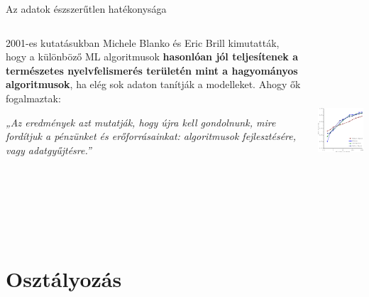 \documentclass[english, aspectratio=169]{beamer}
\makeatletter
\let\origtableofcontents=\tableofcontents
\def\tableofcontents{\@ifnextchar[{\origtableofcontents}{\gobbletableofcontents}}
\def\gobbletableofcontents#1{\origtableofcontents}
\makeatother
\begin{document}
\begin{frame}{Az adatok észszerűtlen hatékonysága}
\begin{columns}
\begin{column}{.5\textwidth}
2001-es kutatásukban Michele Blanko és Eric Brill kimutatták, hogy a különböző ML algoritmusok \textbf{hasonlóan jól teljesítenek a természetes nyelvfelismerés területén mint a hagyományos algoritmusok}, ha elég sok adaton tanítják a modelleket. Ahogy ők fogalmaztak:\par\medskip
\emph{„Az eredmények azt mutatják, hogy újra kell gondolnunk, mire fordítjuk a pénzünket és erőforrásainkat: algoritmusok fejlesztésére, vagy adatgyűjtésre.”}
\end{column}
\begin{column}{.5\textwidth}
\begin{center}
\includegraphics[width=7cm, height=7cm, keepaspectratio]{images/osztalyozas_11.png}
\end{center}
\end{column}
\end{columns}
\end{frame}

\section{Osztályozás}

\begin{frame}
\tableofcontents[currentsection]
\end{frame}
\end{document}
